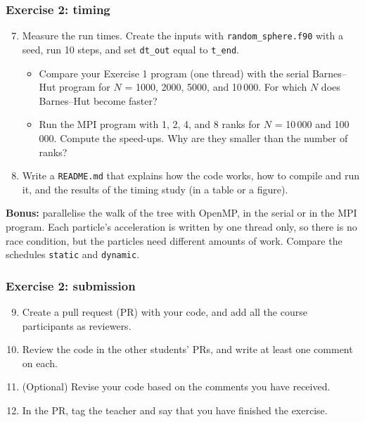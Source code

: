 \begin{frame}
  \frametitle{Exercise 2: timing}
  \begin{enumerate}
    \setcounter{enumi}{6}
    \item Measure the run times. Create the inputs with \texttt{random\_sphere.f90} with a seed, run 10 steps, and set \texttt{dt\_out} equal to \texttt{t\_end}.
      \begin{itemize}
        \item Compare your Exercise 1 program (one thread) with the serial Barnes--Hut program for $N$ = 1000, 2000, 5000, and 10\,000. For which $N$ does Barnes--Hut become faster?
        \item Run the MPI program with 1, 2, 4, and 8 ranks for $N$ = 10\,000 and 100\,000. Compute the speed-ups. Why are they smaller than the number of ranks?
      \end{itemize}
    \item Write a \texttt{README.md} that explains how the code works, how to compile and run it, and the results of the timing study (in a table or a figure).
  \end{enumerate}

  \vspace*{2mm}
  \textbf{Bonus:} parallelise the walk of the tree with OpenMP, in the serial or in the MPI program. Each particle's acceleration is written by one thread only, so there is no race condition, but the particles need different amounts of work. Compare the schedules \texttt{static} and \texttt{dynamic}.
\end{frame}


\begin{frame}
  \frametitle{Exercise 2: submission}
  \begin{enumerate}
    \setcounter{enumi}{8}
    \item Create a pull request (PR) with your code, and add all the course participants as reviewers.
    \item Review the code in the other students' PRs, and write at least one comment on each.
    \item (Optional) Revise your code based on the comments you have received.
    \item In the PR, tag the teacher and say that you have finished the exercise.
  \end{enumerate}
\end{frame}


